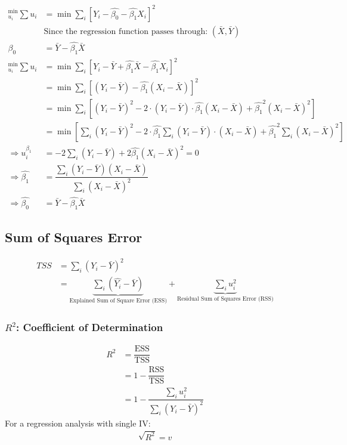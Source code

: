\documentclass[openany,b5paper]{article}
\begin{document}
\begin{align*}
	\displaystyle^{\min}_{u_i} \sum u_i &= \min \sum_i \left[ Y_i - \hat{\beta_0} - \hat{\beta_1} X_i\right]^2\\
	&\text{Since the regression function passes through: } \left(\bar{X},\bar{Y}\right) \tag*{}\\
	\beta_0 &= \bar{Y} - \hat{\beta_1}\bar{X}\\
	\displaystyle^{\min}_{u_i} \sum u_i &= \min \sum_i \left[ Y_i - \bar{Y} + \hat{\beta_1} \bar{X} - \hat{\beta_1} X_i\right]^2\\
	& = \min \sum_i \left[\left(Y_i - \bar{Y}\right) - \hat{\beta_1} \left(X_i - \bar{X}\right)\right]^2\\
	& = \min \sum_i \left[\left(Y_i - \bar{Y}\right)^2 - 2 \cdot \left(Y_i - \bar{Y}\right) \cdot \hat{\beta_1} \left(X_i - \bar{X}\right) + \hat{\beta_1}^2 \left(X_i - \bar{X}\right)^2 \right]\\
	& = \min \left[\sum_i \left(Y_i - \bar{Y}\right)^2 - 2 \cdot \hat{\beta_1} \sum_i \left(Y_i - \bar{Y}\right) \cdot  \left(X_i - \bar{X}\right) + \hat{\beta_1}^2 \sum_i \left(X_i - \bar{X}\right)^2 \right]\\
	\Rightarrow u_i^{\beta_1} &= - 2 \sum_i \left(Y_i - \bar{Y}\right) + 2 \hat{\beta_1} \left(X_i - \bar{X}\right)^2 = 0 \tag{For optima Conditions}\\
	\Rightarrow \hat{\beta_1} &= \boxed{\dfrac{\sum_i (Y_i - \bar{Y})(X_i - \bar{X})}{\sum_i (X_i - \bar{X})^2}}\\
	\Rightarrow \hat{\beta_0} &= \boxed{\bar{Y} - \hat{\beta_1} \bar{X}}
\end{align*}

\subsection{Sum of Squares Error}
\begin{align}
	TSS &= \sum_i (Y_i - \bar{Y})^2\\
	& = \underbrace{\sum_i (\hat{Y_i}-\bar{Y})}_{\text{Explained Sum of Square Error (ESS)}} + \underbrace{\sum_i u_i^2}_{\text{Residual Sum of Squares Error (RSS)}}
\end{align}
\subsubsection{$R^2$: Coefficient of Determination}
\begin{align}
	R^2 &= \dfrac{\text{ESS}}{\text{TSS}}\\
	&= 1 - \dfrac{\text{RSS}}{\text{TSS}}\\
	&= 1 - \dfrac{\sum_i u_i^2}{\sum_i (Y_i-\bar{Y})^2}
\end{align}
For a regression analysis with single IV:
\begin{align*}
	\sqrt{R^2} = v
\end{align*}
\end{document}
